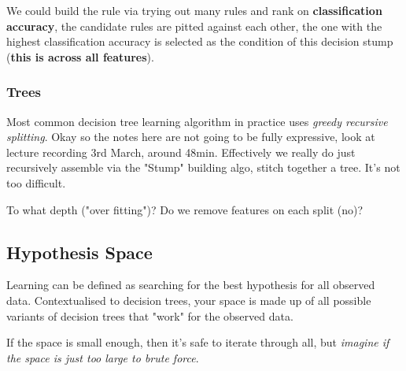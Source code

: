 \documentclass{article}
\begin{document}
We could build the rule via trying out many rules and rank on {\bf classification accuracy}, the candidate rules are pitted against each other, the one with the highest classification accuracy is selected as the condition of this decision stump ({\bf this is across all features}).

\subsubsection*{Trees}
Most common decision tree learning algorithm in practice uses {\it greedy recursive splitting}. Okay so the notes here are not going to be fully expressive, look at lecture recording 3rd March, around 48min. Effectively we really do just recursively assemble via the "Stump" building algo, stitch together a tree. It's not too difficult.

To what depth ("over fitting")? Do we remove features on each split (no)?

\subsection*{Hypothesis Space}
Learning can be defined as searching for the best hypothesis for all observed data. Contextualised to decision trees, your space is made up of all possible variants of decision trees that "work" for the observed data.

If the space is small enough, then it's safe to iterate through all, but {\it imagine if the space is just too large to brute force}.
\end{document}
